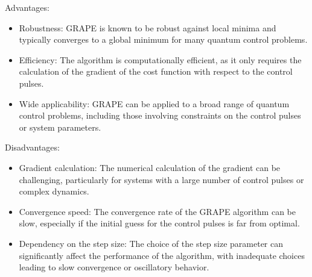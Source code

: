 Advantages:

\begin{itemize}
    \item Robustness: GRAPE is known to be robust against local minima and typically converges to a global minimum for many quantum control problems.
    \item Efficiency: The algorithm is computationally efficient, as it only requires the calculation of the gradient of the cost function with respect to the control pulses.
    \item Wide applicability: GRAPE can be applied to a broad range of quantum control problems, including those involving constraints on the control pulses or system parameters.
\end{itemize}

Disadvantages:

\begin{itemize}
    \item Gradient calculation: The numerical calculation of the gradient can be challenging, particularly for systems with a large number of control pulses or complex dynamics.
    \item Convergence speed: The convergence rate of the GRAPE algorithm can be slow, especially if the initial guess for the control pulses is far from optimal.
    \item Dependency on the step size: The choice of the step size parameter can significantly affect the performance of the algorithm, with inadequate choices leading to slow convergence or oscillatory behavior.
\end{itemize}
